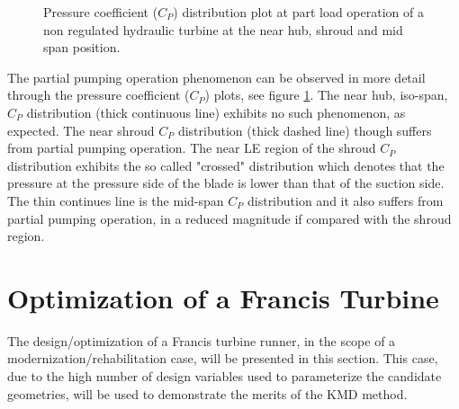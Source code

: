 \begin{figure}[h!]
\begin{minipage}[b]{1\linewidth}
 \centering
\end{minipage}
\caption{Pressure coefficient ($C_P$) distribution plot at part load operation of a non regulated hydraulic turbine at the near hub, shroud and mid span position.}
\label{design-pumpS2}
\end{figure}

The partial pumping operation phenomenon can be observed in more detail through the pressure coefficient ($C_P$) plots, see figure \ref{design-pumpS2}. The near hub, iso-span, $C_P$ distribution (thick continuous line) exhibits no such phenomenon, as expected.  The near shroud $C_P$ distribution (thick dashed line) though suffers from partial pumping operation. The near LE region of the shroud $C_P$ distribution exhibits the so called "crossed" distribution which denotes that the pressure at the pressure side of the blade is lower than that of the suction side. The thin continues line is the mid-span $C_P$ distribution and it also suffers from partial pumping operation, in a reduced magnitude if compared with the shroud region.        

\section{Optimization of a Francis Turbine} %
The design/optimization of a Francis turbine runner, in the scope of a modernization/rehabilitation case, will be presented in this section. This case, due to the high number of design variables used to parameterize the candidate geometries, will be used to demonstrate the merits of the KMD method. 
\label{Francis-runner}

